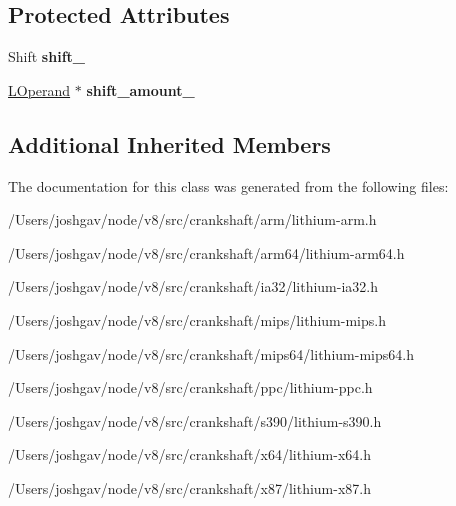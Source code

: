 \subsection*{Protected Attributes}
\begin{DoxyCompactItemize}
\item 
Shift {\bfseries shift\+\_\+}\hypertarget{classv8_1_1internal_1_1_l_bit_i_a8d55e3eb070007d29a508942936ee05b}{}\label{classv8_1_1internal_1_1_l_bit_i_a8d55e3eb070007d29a508942936ee05b}

\item 
\hyperlink{classv8_1_1internal_1_1_l_operand}{L\+Operand} $\ast$ {\bfseries shift\+\_\+amount\+\_\+}\hypertarget{classv8_1_1internal_1_1_l_bit_i_aaadf13545341a68bea19fde3703a911d}{}\label{classv8_1_1internal_1_1_l_bit_i_aaadf13545341a68bea19fde3703a911d}

\end{DoxyCompactItemize}
\subsection*{Additional Inherited Members}


The documentation for this class was generated from the following files\+:\begin{DoxyCompactItemize}
\item 
/\+Users/joshgav/node/v8/src/crankshaft/arm/lithium-\/arm.\+h\item 
/\+Users/joshgav/node/v8/src/crankshaft/arm64/lithium-\/arm64.\+h\item 
/\+Users/joshgav/node/v8/src/crankshaft/ia32/lithium-\/ia32.\+h\item 
/\+Users/joshgav/node/v8/src/crankshaft/mips/lithium-\/mips.\+h\item 
/\+Users/joshgav/node/v8/src/crankshaft/mips64/lithium-\/mips64.\+h\item 
/\+Users/joshgav/node/v8/src/crankshaft/ppc/lithium-\/ppc.\+h\item 
/\+Users/joshgav/node/v8/src/crankshaft/s390/lithium-\/s390.\+h\item 
/\+Users/joshgav/node/v8/src/crankshaft/x64/lithium-\/x64.\+h\item 
/\+Users/joshgav/node/v8/src/crankshaft/x87/lithium-\/x87.\+h\end{DoxyCompactItemize}
